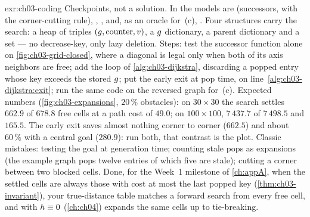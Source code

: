 
\begin{solution}{exr:ch03-coding}
Checkpoints, not a solution. In  the models are 
(successors, with the corner-cutting rule), , ,
 and, as an oracle for~(c),
. Four structures carry the search: a heap of triples
$(g,\text{counter},v)$, a $g$ dictionary, a parent dictionary and a \Closed set
--- no decrease-key, only lazy deletion. Steps: test the successor function alone on
\cref{fig:ch03-grid-closed}, where a diagonal is legal only when both of its axis
neighbors are free; add the loop of \cref{alg:ch03-dijkstra}, discarding a popped entry
whose key exceeds the stored $g$; put the early exit at pop time, on
line~\ref{alg:ch03-dijkstra:exit}; run the same code on the reversed graph for~(c).
Expected numbers (\cref{fig:ch03-expansions}, $20\,\%$ obstacles): on $30\times30$ the
search settles $662.9$ of $678.8$ free cells at a path cost of $49.0$; on $100\times100$,
$7\,437.7$ of $7\,498.5$ and $165.5$. The early exit saves almost nothing corner to corner
($662.5$) and about $60\,\%$ with a central goal ($280.9$): run both, that contrast is the
plot. Classic mistakes: testing the goal at generation time; counting stale pops as
expansions (the example graph pops twelve entries of which five are stale); cutting a
corner between two blocked cells. Done, for the Week~1 milestone of \cref{ch:appA}, when
the settled cells are always those with cost at most the last popped key
(\cref{thm:ch03-invariant}), your true-distance table matches a forward search from every
free cell, and \astar with $h\equiv0$ (\cref{ch:ch04}) expands the same cells up to
tie-breaking.
\end{solution}
